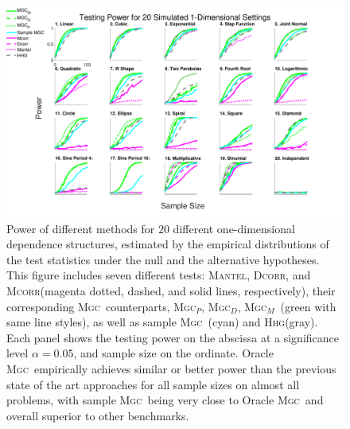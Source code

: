 \documentclass[11pt]{article}
\providecommand{\sct}[1]{{\normalfont\textsc{#1}}}
\newcommand{\Mgc}{\sct{Mgc}}
\newcommand{\Mgcp}{\sct{Mgc$_P$}}
\newcommand{\Mgcd}{\sct{Mgc$_D$}}
\newcommand{\Mgcm}{\sct{Mgc$_M$}}
\newcommand{\Hhg}{\sct{Hhg}}
\newcommand{\Dcorr}{\sct{Dcorr}}
\newcommand{\Mcorr}{\sct{Mcorr}}
\newcommand{\Mantel}{\sct{Mantel}}
\begin{document}
\begin{figure}[htbp]
\includegraphics[width=1.0\textwidth]{Figures/Fig1DPowerAll}
\caption{
Power of different methods for $20$ different one-dimensional dependence structures, estimated by the empirical distributions of the test statistics under the null and the alternative hypotheses.
This figure includes seven different tests: \Mantel, \Dcorr, and \Mcorr  (magenta dotted, dashed, and solid lines, respectively), their corresponding \Mgc~counterparts, \Mgcp, \Mgcd, \Mgcm~(green with same line styles), as well as sample \Mgc~(cyan) and \Hhg (gray).
Each panel shows the testing power on the abscissa at a significance level $\alpha=0.05$, and sample size on the ordinate.
Oracle \Mgc~empirically achieves similar or better power than the previous state of the art approaches for all sample sizes on almost all problems, with sample \Mgc~being very close to Oracle \Mgc~and overall superior to other benchmarks.}
\label{f:1DAll}
\end{figure}
\end{document}
